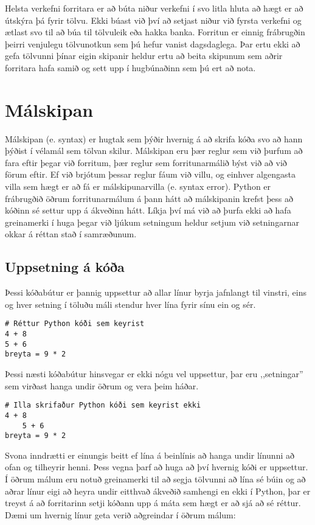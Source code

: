 \documentclass[11pt,fleqn]{book} %
\begin{document}
Helsta verkefni forritara er að búta niður verkefni í svo litla hluta að hægt er að útskýra þá fyrir tölvu.
Ekki búast við því að setjast niður við fyrsta verkefni og ætlast svo til að búa til tölvuleik eða hakka banka.
Forritun er einnig frábrugðin þeirri venjulegu tölvunotkun sem þú hefur vanist dagsdaglega.
Þar ertu ekki að gefa tölvunni þínar eigin skipanir heldur ertu að beita skipunum sem aðrir forritara hafa samið og sett upp í hugbúnaðinn sem þú ert að nota.


\section{Málskipan}

Málskipan (e. syntax) er hugtak sem þýðir hvernig á að skrifa kóða svo að hann þýðist í vélamál sem tölvan skilur. 
Málskipan eru þær reglur sem við þurfum að fara eftir þegar við forritum, þær reglur sem forritunarmálið býst við að við förum eftir. 
Ef við brjótum þessar reglur fáum við villu, og einhver algengasta villa sem hægt er að fá er málskipunarvilla (e. syntax error). 
Python er frábrugðið öðrum forritunarmálum á þann hátt að málskipanin krefst þess að kóðinn sé settur upp á ákveðinn hátt. 
Líkja því má við að þurfa ekki að hafa greinamerki í huga þegar við ljúkum setningum heldur setjum við setningarnar okkar á réttan stað í samræðunum.

\subsection{Uppsetning á kóða}
Þessi kóðabútur er þannig uppsettur að allar línur byrja jafnlangt til vinstri, eins og hver setning í töluðu máli stendur hver lína fyrir sínu ein og sér.
\begin{lstlisting}[caption=Réttur Python kóði]
# Réttur Python kóði sem keyrist
4 + 8
5 + 6
breyta = 9 * 2
\end{lstlisting}

Þessi næsti kóðabútur hinsvegar er ekki nógu vel uppsettur, þar eru ,,setningar'' sem virðast hanga undir öðrum og vera þeim háðar. 

\begin{lstlisting}[caption=Rangur Python kóði]
# Illa skrifaður Python kóði sem keyrist ekki
4 + 8
	5 + 6
breyta = 9 * 2
\end{lstlisting}

Svona inndrætti er einungis beitt ef lína á beinlínis að hanga undir línunni að ofan og tilheyrir henni. 
Þess vegna þarf að huga að því hvernig kóði er uppsettur. 
Í öðrum málum eru notuð greinamerki til að segja tölvunni að lína sé búin og að aðrar línur eigi að heyra undir eitthvað ákveðið samhengi en ekki í Python, þar er treyst á að forritarinn setji kóðann upp á máta sem hægt er að sjá að sé réttur. 
Dæmi um hvernig línur geta verið aðgreindar í öðrum málum:
\end{document}
